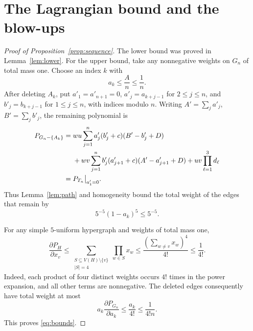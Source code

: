 \documentclass[11pt]{article}
\numberwithin{equation}{section}
\begin{document}
\section{The Lagrangian bound and the blow-ups}\label{sec:conclusion}

\begin{proof}[Proof of Proposition~\ref{prop:sequence}]
The lower bound was proved in Lemma~\ref{lem:lower}.
For the upper bound, take any nonnegative weights on \(G_n\) of
total mass one. Choose an index \(k\) with
\[
 a_k\le\frac{A}{n}\le\frac1n.
\]
After deleting \(A_k\), put \(a'_1=a'_{n+1}=0\),
\(a'_j=a_{k+j-1}\) for \(2\le j\le n\), and
\(b'_j=b_{k+j-1}\) for \(1\le j\le n\), with indices modulo \(n\).
Writing \(A'=\sum_j a'_j\), \(B'=\sum_j b'_j\),
the remaining polynomial is
\begin{align}
 P_{G_n-\{A_k\}}
 ={}&wu\sum_{j=1}^{n}
 a'_j(b'_j+c)(B'-b'_j+D) \notag\\
 &+wv\sum_{j=1}^{n}
 b'_j(a'_{j+1}+c)(A'-a'_{j+1}+D)
 +uv\prod_{\ell=1}^{3}d_\ell \notag\\
 ={}&P_{T_n}\big|_{a'_1=0}.
 \label{eq:deletion-identity}
\end{align}
Thus Lemma~\ref{lem:path} and homogeneity bound the total weight of the
edges that remain by
\[
 5^{-5}(1-a_k)^{5}\le5^{-5}.
\]

For any simple \(5\)-uniform hypergraph and weights of total
mass one,
\begin{equation}\label{eq:derivative}
 \frac{\partial P_H}{\partial x_v}
 \le\sum_{\substack{S\subseteq V(H)\setminus\{v\}\\|S|=4}}
        \prod_{w\in S}x_w
 \le\frac{(\sum_{w\ne v}x_w)^{4}}{4!}
 \le\frac1{4!}.
\end{equation}
Indeed, each product of four distinct weights occurs \(4!\)
times in the power expansion, and all other terms are nonnegative.
The deleted edges consequently have total weight at most
\[
 a_k\frac{\partial P_{G_n}}{\partial a_k}
 \le\frac{a_k}{4!}\le\frac1{4!n}.
\]
This proves \eqref{eq:bounds}.
\end{proof}
\end{document}

